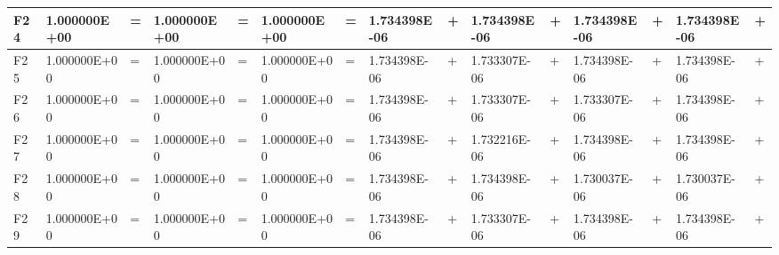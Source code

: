 \documentclass{article} %
\begin{document}
\begin{tabular}{|p{0.3in}|p{0.5in}|p{0.2in}|p{0.5in}|p{0.2in}|p{0.6in}|p{0.1in}|p{0.6in}|p{0.1in}|p{0.5in}|p{0.1in}|p{0.5in}|p{0.1in}|p{0.5in}|p{0.2in}|}
F24 & 1.000000E+00 & = & 1.000000E+00 & = & 1.000000E+00 & = & 1.734398E-06 & + & 1.734398E-06 & + & 1.734398E-06 & + & 1.734398E-06 & + \\ \hline 
F25 & 1.000000E+00 & = & 1.000000E+00 & = & 1.000000E+00 & = & 1.734398E-06 & + & 1.733307E-06 & + & 1.734398E-06 & + & 1.734398E-06 & + \\ \hline 
F26 & 1.000000E+00 & = & 1.000000E+00 & = & 1.000000E+00 & = & 1.734398E-06 & + & 1.733307E-06 & + & 1.733307E-06 & + & 1.734398E-06 & + \\ \hline 
F27 & 1.000000E+00 & = & 1.000000E+00 & = & 1.000000E+00 & = & 1.734398E-06 & + & 1.732216E-06 & + & 1.734398E-06 & + & 1.734398E-06 & + \\ \hline 
F28 & 1.000000E+00 & = & 1.000000E+00 & = & 1.000000E+00 & = & 1.734398E-06 & + & 1.734398E-06 & + & 1.730037E-06 & + & 1.730037E-06 & + \\ \hline 
F29 & 1.000000E+00 & = & 1.000000E+00 & = & 1.000000E+00 & = & 1.734398E-06 & + & 1.733307E-06 & + & 1.734398E-06 & + & 1.734398E-06 & + \\ \hline 
\end{tabular}
\end{document}
